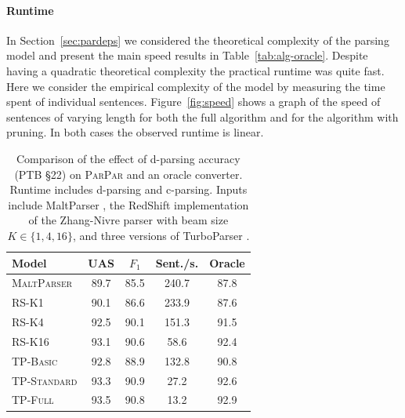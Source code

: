 \documentclass[11pt,letterpaper]{article}
\newcommand{\ParseName}{\textsc{ParPar}}
\begin{document}
\paragraph{Runtime}

In Section~\ref{sec:pardeps} we considered the theoretical 
complexity of the parsing model and present the main 
speed results in Table~\ref{tab:alg-oracle}.
Despite having a quadratic theoretical complexity
the practical runtime was quite fast.
Here we consider the empirical complexity of the 
model by measuring the time spent of individual sentences. 
Figure~\ref{fig:speed} shows a graph of the speed of
sentences of varying length for both the full algorithm
and for the algorithm with pruning. In both 
cases the observed runtime is  linear.







\begin{table}
  \centering
  \small

  \begin{tabular}{|l|cccc|}
    \hline
    Model & UAS  & $F_1$ & Sent./s.  & Oracle  \\
    \hline

    \hline
    \textsc{MaltParser}  & 89.7 & 85.5 & 240.7& 87.8 \\
    \textsc{RS-K1}       & 90.1 & 86.6 & 233.9& 87.6 \\
    \textsc{RS-K4}       & 92.5 & 90.1 & 151.3& 91.5 \\
    \textsc{RS-K16}      & 93.1 & 90.6 & 58.6 & 92.4 \\
    \textsc{TP-Basic}    & 92.8 & 88.9 & 132.8& 90.8 \\
    \textsc{TP-Standard} & 93.3 & 90.9 & 27.2 & 92.6 \\
    \textsc{TP-Full}     & 93.5 & 90.8 & 13.2 & 92.9 \\
    \hline
  \end{tabular}


  
  \caption{Comparison of the effect of d-parsing accuracy (PTB \S 22)
    on \ParseName{} and an oracle converter.  Runtime includes
    d-parsing and c-parsing.  
    Inputs include 
 MaltParser \cite{nivre2006maltparser}, 
    the RedShift implementation of the Zhang-Nivre parser
    \cite{zhang2011transition} with beam size $K \in \{1, 4, 16\}$,
and three versions of TurboParser
    \cite{martins2013turning}.
\label{tab:oracle} }
\end{table}
\end{document}
